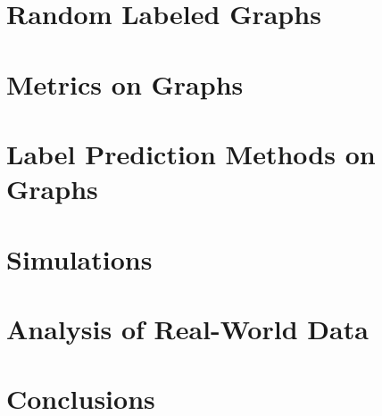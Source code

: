 \documentclass[11pt,oneside]{report}
\theoremstyle{definition}
\begin{document}
\chapter{Random Labeled Graphs}
\label{chap:random_graphs}



\chapter{Metrics on Graphs}
\label{chap:metrics}



\chapter{Label Prediction Methods on Graphs}
\label{chap:prediction}



\chapter{Simulations}
\label{chap:simulations}



\chapter{Analysis of Real-World Data}
\label{chap:real_world}



\chapter{Conclusions}
\label{chap:conclusions}





\end{document}
